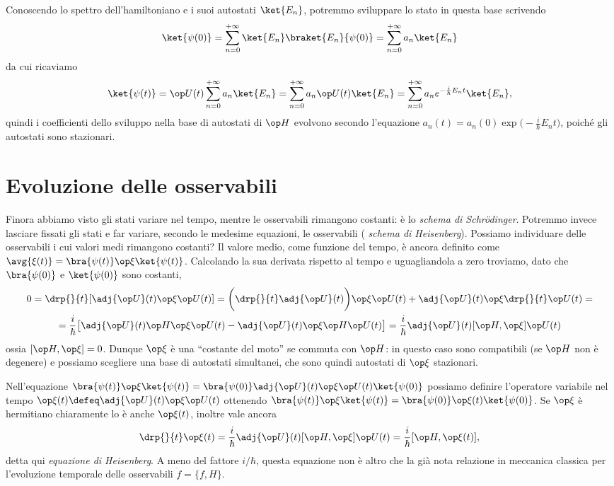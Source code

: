 Conoscendo lo spettro dell'hamiltoniano e i suoi autostati $\ket{E_n}$, potremmo sviluppare lo stato in questa base scrivendo
\begin{equation}
	\ket{\psi(0)}=\sum_{n=0}^{+\infty}\ket{E_n}\braket{E_n}{\psi(0)}=\sum_{n=0}^{+\infty}a_n\ket{E_n}
\end{equation}
da cui ricaviamo
\begin{equation}
	\ket{\psi(t)}=\op U(t)\sum_{n=0}^{+\infty}a_n\ket{E_n}=\sum_{n=0}^{+\infty}a_n\op U(t)\ket{E_n}=\sum_{n=0}^{+\infty}a_ne^{-\frac{i}{\hbar}E_nt}\ket{E_n},
\end{equation}
quindi i coefficienti dello sviluppo nella base di autostati di $\op H$ evolvono secondo l'equazione $a_n(t)=a_n(0)\exp\big(-\frac{i}{\hbar}E_nt\big)$, poich\'e gli autostati sono stazionari.

\section{Evoluzione delle osservabili}
Finora abbiamo visto gli stati variare nel tempo, mentre le osservabili rimangono costanti: è lo \emph{schema di Schr\"odinger}.
Potremmo invece lasciare fissati gli stati e far variare, secondo le medesime equazioni, le osservabili ( \emph{schema di Heisenberg}).
Possiamo individuare delle osservabili i cui valori medi rimangono costanti?
Il valore medio, come funzione del tempo, è ancora definito come $\avg{\xi(t)}=\bra{\psi(t)}\op\xi\ket{\psi(t)}$.
Calcolando la sua derivata rispetto al tempo e uguagliandola a zero troviamo, dato che $\bra{\psi(0)}$ e $\ket{\psi(0)}$ sono costanti,
\begin{multline}
	0=\drp{}{t}[\adj{\op U}(t)\op\xi\op U(t)]=\bigg(\drp{}{t}\adj{\op U}(t)\bigg)\op\xi\op U(t)+\adj{\op U}(t)\op\xi\drp{}{t}\op U(t)=\\
	=\frac{i}{\hbar}\big[\adj{\op U}(t)\op H\op\xi\op U(t)-\adj{\op U}(t)\op\xi\op H\op U(t)\big]=\frac{i}{\hbar}\adj{\op U}(t)[\op H,\op\xi]\op U(t)
\end{multline}
ossia $[\op H,\op\xi]=0$.
Dunque $\op\xi$ è una ``costante del moto'' se commuta con $\op H$: in questo caso sono compatibili (se $\op H$ non è degenere) e possiamo scegliere una base di autostati simultanei, che sono quindi autostati di $\op\xi$ stazionari.

Nell'equazione $\bra{\psi(t)}\op\xi\ket{\psi(t)}=\bra{\psi(0)}\adj{\op U}(t)\op\xi\op U(t)\ket{\psi(0)}$ possiamo definire l'operatore variabile nel tempo $\op\xi(t)\defeq\adj{\op U}(t)\op\xi\op U(t)$ ottenendo $\bra{\psi(t)}\op\xi\ket{\psi(t)}=\bra{\psi(0)}\op\xi(t)\ket{\psi(0)}$.
Se $\op\xi$ è hermitiano chiaramente lo è anche $\op\xi(t)$, inoltre vale ancora
\begin{equation}
	\drp{}{t}\op\xi(t)=\frac{i}{\hbar}\adj{\op U}(t)[\op H,\op\xi]\op U(t)=\frac{i}{\hbar}[\op H,\op\xi(t)],
	\label{eq:evoluzione-osservabili-heisenberg}
\end{equation}
detta qui \emph{equazione di Heisenberg}.
A meno del fattore $i/\hbar$, questa equazione non è altro che la già nota relazione in meccanica classica per l'evoluzione temporale delle osservabili $\dot{f}=\{f,H\}$.


